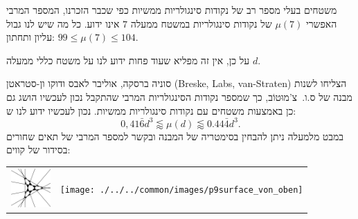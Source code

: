 \begin{surferPage}[216 Singularities]{משטחים בעלי מספר רב של נקודות סינגולריות ממשיות}
    כפי שכבר הזכרנו, המספר המרבי האפשרי
    $\mu(7)$ של נקודות סינגולריות במשטח ממעלה $7$ אינו ידוע.
    כל מה שיש לנו גבול עליון ותחתון: $99\le \mu(7) \le 104$. 


    על כן, אין זה מפליא שעוד פחות ידוע לנו על משטח כללי ממעלה $d$. 

    סוניה ברסקה, אוליבר לאבס ודוקו ון-סטראטן (Breske, Labs, van-Straten) הצליחו לשנות
    מבנה של ס.ו.\  צ'מוּטוֹב, כך שמספר נקודות הסינגולריות 
    המרבי שהתקבל נכון לעכשיו הושג גם כן באמצעות משטחים עם
    נקודות סינגולריות ממשיות. 
    נכון לעכשיו ידוע לנו ש:
    \[0,41\bar{6}d^3 \lessapprox \mu(d) \lessapprox 0.44\bar{4} d^3.\]
     במבט מלמעלה ניתן להבחין בסימטריה של המבנה ובקשר
    למספר המרבי של תאים שחורים בסידור של קווים:
    \begin{center}
      \begin{tabular}{c@{\qquad}c}
        \includegraphics[height=1.5cm]{./../../common/images/vielesing.pdf}
        &
        \texttt{[image: ./../../common/images/p9surface\_von\_oben]}
      \end{tabular}
    \end{center}
\end{surferPage}
